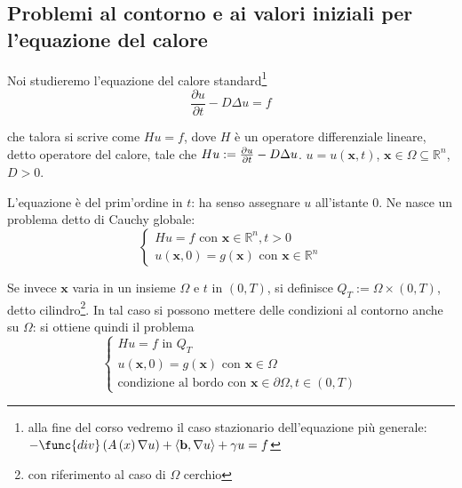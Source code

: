\documentclass{article}
\begin{document}
\subsection{Problemi al contorno e ai valori iniziali per l'equazione del
calore}

Noi studieremo l'equazione del calore standard\footnote{%
alla fine del corso vedremo il caso stazionario dell'equazione pi\`{u}
generale: $-\func{div}\left( A\left( x\right) \nabla u\right) +\left\langle 
\mathbf{b},\nabla u\right\rangle +\gamma u=f$} 
\begin{equation*}
\frac{\partial u}{\partial t}-D\Delta u=f
\end{equation*}

che talora si scrive come $Hu=f$, dove $H$ \`{e} un operatore differenziale
lineare, detto operatore del calore, tale che $Hu:=\frac{\partial u}{%
\partial t}-D\Delta u$. $u=u\left( \mathbf{x},t\right) $, $\mathbf{x}\in
\Omega \subseteq 
\mathbb{R}
^{n}$, $D>0$.

L'equazione \`{e} del prim'ordine in $t$: ha senso assegnare $u$ all'istante 
$0$. Ne nasce un problema detto di Cauchy globale:%
\begin{equation*}
\left\{ 
\begin{array}{c}
Hu=f\text{ con }\mathbf{x}\in 
\mathbb{R}
^{n},t>0 \\ 
u\left( \mathbf{x},0\right) =g\left( \mathbf{x}\right) \text{ con }\mathbf{x}%
\in 
\mathbb{R}
^{n}%
\end{array}%
\right.
\end{equation*}

Se invece $\mathbf{x}$ varia in un insieme $\Omega $ e $t$ in $\left(
0,T\right) $, si definisce $Q_{T}:=\Omega \times \left( 0,T\right) $, detto
cilindro\footnote{%
con riferimento al caso di $\Omega $ cerchio}. In tal caso si possono
mettere delle condizioni al contorno anche su $\Omega $: si ottiene quindi
il problema%
\begin{equation*}
\left\{ 
\begin{array}{c}
Hu=f\text{ in }Q_{T} \\ 
u\left( \mathbf{x},0\right) =g\left( \mathbf{x}\right) \text{ con }\mathbf{x}%
\in \Omega \\ 
\text{condizione al bordo con }\mathbf{x}\in \partial \Omega ,t\in \left(
0,T\right)%
\end{array}%
\right.
\end{equation*}
\end{document}
